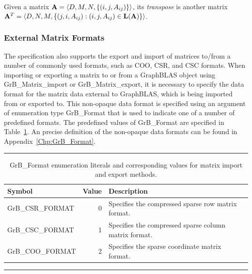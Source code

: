 Given a matrix ${\bf A} = \langle D, M, N, \{ (i,j,A_{ij}) \} \rangle$,
its \emph{transpose} is another matrix ${\bf A}^T = \langle D, N, M, \{
(j,i,A_{ij}) : (i,j,A_{ij}) \in \mathbf{L}({\bf A}) \} \rangle$.

\subsubsection{External Matrix Formats}

The specification also supports the export and import of matrices to/from a 
number of commonly used formats, such as COO, CSR, and CSC formats.  When
importing or exporting a matrix to or from a GraphBLAS object using
{\sf GrB\_Matrix\_import} or {\sf GrB\_Matrix\_export}, it is necessary to
specify the data format for the matrix data external to GraphBLAS, which is
being imported from or exported to.  This non-opaque data format is specified
using an argument of enumeration type {\sf GrB\_Format} that is used to 
indicate one of a number of predefined formats.  The predefined values of 
{\sf GrB\_Format} are specified in Table~\ref{Tab:MatrixFormatEnumerationValues}.  
An precise definition of the non-opaque data formats can be found in 
Appendix~\ref{Chp:GrB_Format}.

\begin{table}[bh]
\hrule
\begin{center}
\caption{{\sf GrB\_Format} enumeration literals and corresponding values for 
matrix import and export methods.}
\label{Tab:MatrixFormatEnumerationValues}

\begin{tabular}{l|r|p{3.5in}}
Symbol    & Value & Description \\ \hline
{\sf GrB\_CSR\_FORMAT} & 0 & Specifies the compressed sparse row matrix format.\\
{\sf GrB\_CSC\_FORMAT} & 1 & Specifies the compressed sparse column matrix format.\\
{\sf GrB\_COO\_FORMAT} & 2 & Specifies the sparse coordinate matrix format.\\
\end{tabular}

\end{center}
\hrule
\end{table}


